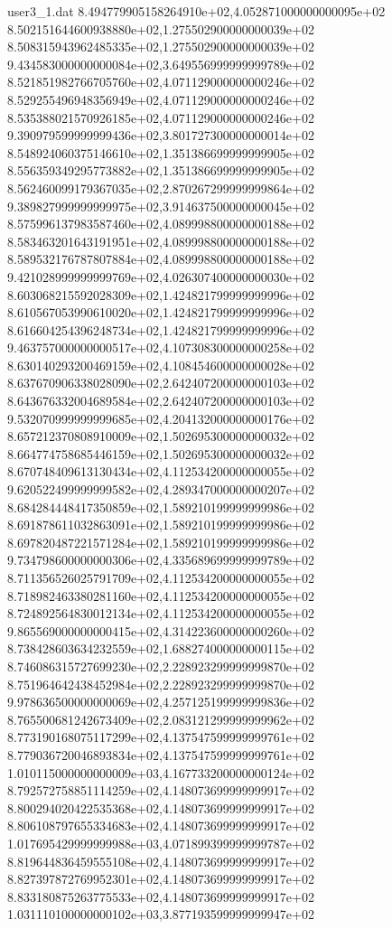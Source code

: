 \begin{filecontents}{user3_1.dat}
8.494779905158264910e+02,4.052871000000000095e+02
8.502151644600938880e+02,1.275502900000000039e+02
8.508315943962485335e+02,1.275502900000000039e+02
9.434583000000000084e+02,3.649556999999999789e+02
8.521851982766705760e+02,4.071129000000000246e+02
8.529255496948356949e+02,4.071129000000000246e+02
8.535388021570926185e+02,4.071129000000000246e+02
9.390979599999999436e+02,3.801727300000000014e+02
8.548924060375146610e+02,1.351386699999999905e+02
8.556359349295773882e+02,1.351386699999999905e+02
8.562460099179367035e+02,2.870267299999999864e+02
9.389827999999999975e+02,3.914637500000000045e+02
8.575996137983587460e+02,4.089998800000000188e+02
8.583463201643191951e+02,4.089998800000000188e+02
8.589532176787807884e+02,4.089998800000000188e+02
9.421028999999999769e+02,4.026307400000000030e+02
8.603068215592028309e+02,1.424821799999999996e+02
8.610567053990610020e+02,1.424821799999999996e+02
8.616604254396248734e+02,1.424821799999999996e+02
9.463757000000000517e+02,4.107308300000000258e+02
8.630140293200469159e+02,4.108454600000000028e+02
8.637670906338028090e+02,2.642407200000000103e+02
8.643676332004689584e+02,2.642407200000000103e+02
9.532070999999999685e+02,4.204132000000000176e+02
8.657212370808910009e+02,1.502695300000000032e+02
8.664774758685446159e+02,1.502695300000000032e+02
8.670748409613130434e+02,4.112534200000000055e+02
9.620522499999999582e+02,4.289347000000000207e+02
8.684284448417350859e+02,1.589210199999999986e+02
8.691878611032863091e+02,1.589210199999999986e+02
8.697820487221571284e+02,1.589210199999999986e+02
9.734798600000000306e+02,4.335689699999999789e+02
8.711356526025791709e+02,4.112534200000000055e+02
8.718982463380281160e+02,4.112534200000000055e+02
8.724892564830012134e+02,4.112534200000000055e+02
9.865569000000000415e+02,4.314223600000000260e+02
8.738428603634232559e+02,1.688274000000000115e+02
8.746086315727699230e+02,2.228923299999999870e+02
8.751964642438452984e+02,2.228923299999999870e+02
9.978636500000000069e+02,4.257125199999999836e+02
8.765500681242673409e+02,2.083121299999999962e+02
8.773190168075117299e+02,4.137547599999999761e+02
8.779036720046893834e+02,4.137547599999999761e+02
1.010115000000000009e+03,4.167733200000000124e+02
8.792572758851114259e+02,4.148073699999999917e+02
8.800294020422535368e+02,4.148073699999999917e+02
8.806108797655334683e+02,4.148073699999999917e+02
1.017695429999999988e+03,4.071899399999999787e+02
8.819644836459555108e+02,4.148073699999999917e+02
8.827397872769952301e+02,4.148073699999999917e+02
8.833180875263775533e+02,4.148073699999999917e+02
1.031110100000000102e+03,3.877193599999999947e+02

\end{filecontents}
